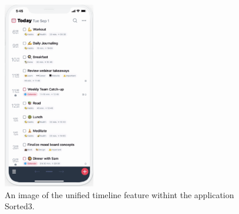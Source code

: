 \begin{figure}[htb]

	\centering
	\includegraphics[width=4cm]{./graphics/sorted3.png}
	\caption{An image of the unified timeline feature withint the application Sorted3\cite{sorted}.}
	\label{fig:sorted3}
	
\end{figure}